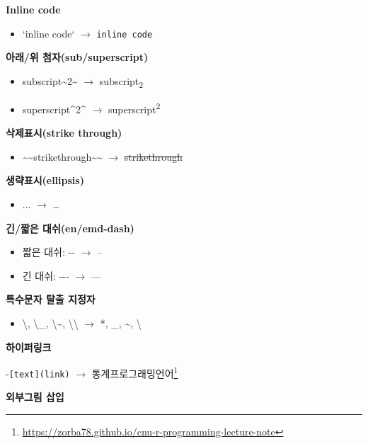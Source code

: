 \documentclass[
  11pt,
]{krantz}
\providecommand{\tightlist}{%
  \setlength{\itemsep}{0pt}\setlength{\parskip}{0pt}}
\renewcommand{\href}[2]{#2\footnote{\url{#1}}}
\begin{document}
\textbf{Inline code}

\begin{itemize}
\tightlist
\item
  {`}inline code` \(\rightarrow\) \texttt{inline\ code}
\end{itemize}

\textbf{아래/위 첨자(sub/superscript)}

\begin{itemize}
\tightlist
\item
  subscript\textasciitilde2\textasciitilde{} \(\rightarrow\) subscript\textsubscript{2}
\item
  superscript\^{}2\^{} \(\rightarrow\) superscript\textsuperscript{2}
\end{itemize}

\textbf{삭제표시(strike through)}

\begin{itemize}
\tightlist
\item
  \textasciitilde\textasciitilde strikethrough\textasciitilde\textasciitilde{} \(\rightarrow\) \sout{strikethrough}
\end{itemize}

\textbf{생략표시(ellipsis)}

\begin{itemize}
\tightlist
\item
  ... \(\rightarrow\) \ldots{}
\end{itemize}

\textbf{긴/짧은 대쉬(en/emd-dash)}

\begin{itemize}
\tightlist
\item
  짧은 대쉬: -\/- \(\rightarrow\) --
\item
  긴 대쉬: -\/-\/- \(\rightarrow\) ---
\end{itemize}

\textbf{특수문자 탈출 지정자}

\begin{itemize}
\tightlist
\item
  \textbackslash*, \textbackslash\_, \textbackslash\textasciitilde, \textbackslash\textbackslash{} \(\rightarrow\) *, \_, \textasciitilde, \textbackslash{}
\end{itemize}

\textbf{하이퍼링크}

-\texttt{{[}text{]}(link)} \(\rightarrow\) \href{https://zorba78.github.io/cnu-r-programming-lecture-note}{통계프로그래밍언어}

\textbf{외부그림 삽입}
\end{document}
